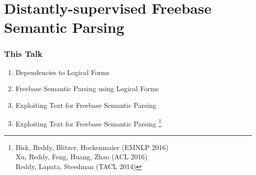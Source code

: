 \documentclass[mathserif,12pt]{beamer}
\newcommand\blfootnote[1]{%
  \begingroup
  \renewcommand\thefootnote{}\footnote{#1}%
  \addtocounter{footnote}{-1}%
  \endgroup
}
\begin{document}
\section{Distantly-supervised Freebase Semantic Parsing}

\begin{frame}
\frametitle{This Talk}
\large 
\begin{enumerate}
 \item Dependencies to Logical Forms
 
 \vspace{2em}
 \item Freebase Semantic Parsing using Logical Forms
 
 \vspace{2em}
 \item Exploiting Text for Freebase Semantic Parsing
\end{enumerate}
\end{frame}

\begin{frame}
\Large
\centering
\vspace{1.5em}
\begin{enumerate}
 \setcounter{enumi}{2}
 \item Exploiting Text for Freebase Semantic Parsing \blfootnote{\color{blue} 
   Bisk, Reddy, Blitzer, Hockenmaier (EMNLP 2016) \\
   \hspace{1.8em}Xu, Reddy, Feng, Huang, Zhao (ACL 2016) \\
   \hspace{1.8em}Reddy, Lapata, Steedman (TACL 2014)}
\end{enumerate}
\end{frame}
\end{document}
